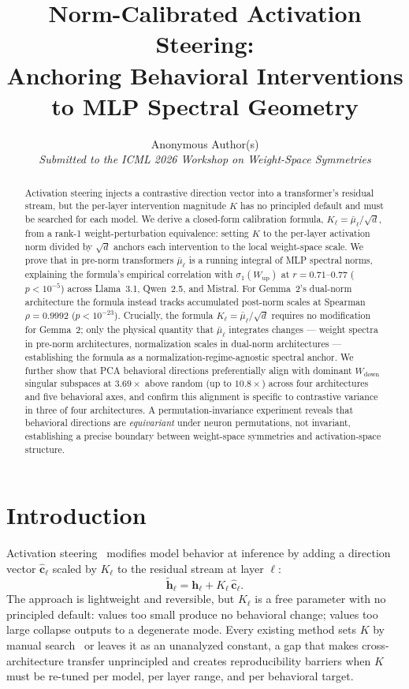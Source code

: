 \documentclass{article}
\title{Norm-Calibrated Activation Steering:\\
       Anchoring Behavioral Interventions to MLP Spectral Geometry}
\author{Anonymous Author(s)\\
\textit{Submitted to the ICML 2026 Workshop on Weight-Space Symmetries}}
\newcommand{\hh}{\mathbf{h}}
\newcommand{\ch}{\hat{\mathbf{c}}}
\newcommand{\mubar}{\bar{\mu}}
\newcommand{\sone}{\sigma_1}
\newcommand{\Wup}{W_{\!\mathrm{up}}}
\newcommand{\Wdn}{W_{\!\mathrm{down}}}
\begin{document}
\maketitle

\begin{abstract}
Activation steering injects a contrastive direction vector into a transformer's residual
stream, but the per-layer intervention magnitude $K$ has no principled default and must
be searched for each model.
We derive a closed-form calibration formula, $K_\ell = \mubar_\ell/\!\sqrt{d}$, from a
rank-1 weight-perturbation equivalence: setting $K$ to the per-layer activation norm
divided by $\sqrt{d}$ anchors each intervention to the local weight-space scale.
We prove that in pre-norm transformers $\mubar_\ell$ is a running integral of MLP
spectral norms, explaining the formula's empirical correlation with $\sone(\Wup)$ at
$r{=}0.71$–$0.77$ ($p{<}10^{-5}$) across Llama~3.1, Qwen~2.5, and Mistral.
For Gemma~2's dual-norm architecture the formula instead tracks accumulated post-norm
scales at Spearman $\rho{=}0.9992$ ($p{<}10^{-23}$).
Crucially, the formula $K_\ell = \mubar_\ell/\!\sqrt{d}$ requires no modification for
Gemma~2; only the physical quantity that $\mubar_\ell$ integrates changes — weight spectra
in pre-norm architectures, normalization scales in dual-norm architectures —
establishing the formula as a normalization-regime-agnostic spectral anchor.
We further show that PCA behavioral directions preferentially align with dominant
$\Wdn$ singular subspaces at $3.69\times$ above random (up to $10.8\times$) across
four architectures and five behavioral axes, and confirm this alignment is specific to
contrastive variance in three of four architectures.
A permutation-invariance experiment reveals that behavioral directions are
\emph{equivariant} under neuron permutations, not invariant, establishing a precise
boundary between weight-space symmetries and activation-space structure.
\end{abstract}

\section{Introduction}
\label{sec:intro}

Activation steering~\citep{turner2023activation,rimsky2024contrastive,zou2023representation}
modifies model behavior at inference by adding a direction vector $\ch_\ell$ scaled by
$K_\ell$ to the residual stream at layer $\ell$:
\[
  \tilde{\hh}_\ell = \hh_\ell + K_\ell\,\ch_\ell.
\]
The approach is lightweight and reversible, but $K_\ell$ is a free parameter with no
principled default: values too small produce no behavioral change; values too large
collapse outputs to a degenerate mode.
Every existing method sets $K$ by manual search~\citep{rimsky2024contrastive} or
leaves it as an unanalyzed constant, a gap that makes cross-architecture transfer
unprincipled and creates reproducibility barriers when $K$ must be re-tuned per model,
per layer range, and per behavioral target.
\end{document}
